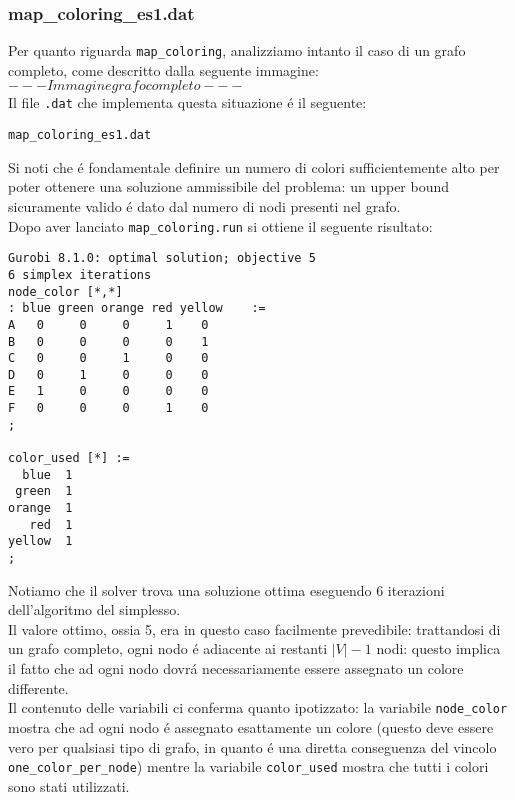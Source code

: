 \documentclass{article}
\begin{document}
\subsubsection{map\_coloring\_es1.dat}

Per quanto riguarda \texttt{map\_coloring}, analizziamo intanto il caso di un grafo completo, come descritto dalla seguente immagine:\\

$ --- Immagine grafo completo --- $\\

Il file \texttt{.dat} che implementa questa situazione \'e il seguente:

\texttt{map\_coloring\_es1.dat}


Si noti che \'e fondamentale definire un numero di colori sufficientemente alto per poter ottenere una soluzione ammissibile del problema: un upper bound sicuramente valido \'e dato dal numero di nodi presenti nel grafo.\\

Dopo aver lanciato \texttt{map\_coloring.run} si ottiene il seguente risultato:\\

\begin{verbatim}
Gurobi 8.1.0: optimal solution; objective 5
6 simplex iterations
node_color [*,*]
: blue green orange red yellow    :=
A   0     0     0     1    0
B   0     0     0     0    1
C   0     0     1     0    0
D   0     1     0     0    0
E   1     0     0     0    0
F   0     0     0     1    0
;

color_used [*] :=
  blue  1
 green  1
orange  1
   red  1
yellow  1
;
\end{verbatim}

Notiamo che il solver trova una soluzione ottima eseguendo 6 iterazioni dell'algoritmo del simplesso.\\
Il valore ottimo, ossia 5, era in questo caso facilmente prevedibile: trattandosi di un grafo completo, ogni nodo \'e adiacente ai restanti $|V| - 1$ nodi: questo implica il fatto che ad ogni nodo dovr\'a necessariamente essere assegnato un colore differente.\\
Il contenuto delle variabili ci conferma quanto ipotizzato: la variabile \texttt{node\_color} mostra che ad ogni nodo \'e assegnato esattamente un colore (questo deve essere vero per qualsiasi tipo di grafo, in quanto \'e una diretta conseguenza del vincolo \texttt{one\_color\_per\_node}) mentre la variabile \texttt{color\_used} mostra che tutti i colori sono stati utilizzati.\\
\end{document}
